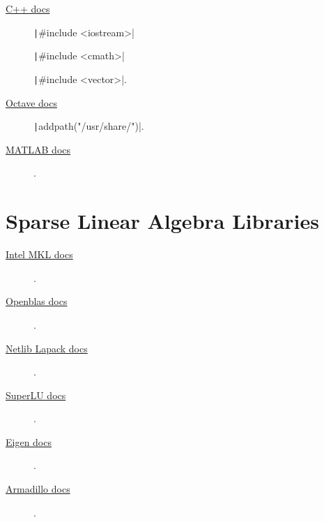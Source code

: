 \begin{description}
	\item[\href{https://en.cppreference.com}{C++ docs}]

	      \texttt|#include <iostream>|

	      \texttt|#include <cmath>|

	      \texttt|#include <vector>|.

	\item[\href{https://docs.octave.org}{Octave docs}]

	      \texttt|addpath("/usr/share/")|.

	\item[\href{https://www.mathworks.com/help/matlab/index.html}{MATLAB docs}]

	      .
\end{description}

\chapter{Sparse Linear Algebra Libraries}


\begin{description}
	\item[\href{https://www.intel.com/content/www/us/en/developer/tools/oneapi/onemkl-documentation.html}{Intel MKL docs}]

	      .

	\item[\href{http://www.openmathlib.org/OpenBLAS/docs}{Openblas docs}]

	      .

	\item[\href{https://www.netlib.org/lapack/explore-html}{Netlib Lapack docs}]

	      .

	\item[\href{https://portal.nersc.gov/project/sparse/superlu/superlu_code_html/index.html}{SuperLU docs}]

	      .

	\item[\href{https://eigen.tuxfamily.org/dox}{Eigen docs}]

	      .

	\item[\href{https://arma.sourceforge.net/docs.html}{Armadillo docs}]

	      .
\end{description}

